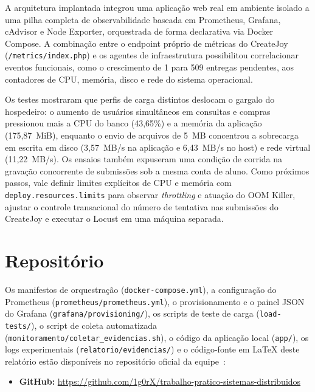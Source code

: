 \documentclass[conference]{IEEEtran}
\begin{document}
A arquitetura implantada integrou uma aplicação web real em ambiente isolado a uma pilha completa de observabilidade baseada em Prometheus, Grafana, cAdvisor e Node Exporter, orquestrada de forma declarativa via Docker Compose. A combinação entre o endpoint próprio de métricas do CreateJoy (\texttt{/metrics/index.php}) e os agentes de infraestrutura possibilitou correlacionar eventos funcionais, como o crescimento de 1 para 509 entregas pendentes, aos contadores de CPU, memória, disco e rede do sistema operacional.

Os testes mostraram que perfis de carga distintos deslocam o gargalo do hospedeiro: o aumento de usuários simultâneos em consultas e compras pressionou mais a CPU do banco (43,65\%) e a memória da aplicação (175,87~MiB), enquanto o envio de arquivos de 5~MB concentrou a sobrecarga em escrita em disco (3,57~MB/s na aplicação e 6,43~MB/s no host) e rede virtual (11,22~MB/s). Os ensaios também expuseram uma condição de corrida na gravação concorrente de submissões sob a mesma conta de aluno. Como próximos passos, vale definir limites explícitos de CPU e memória com \texttt{deploy.resources.limits} para observar \textit{throttling} e atuação do OOM Killer, ajustar o controle transacional do número de tentativa nas submissões do CreateJoy e executar o Locust em uma máquina separada.

\section{Repositório}

Os manifestos de orquestração (\texttt{docker-compose.yml}), a configuração do Prometheus (\texttt{prometheus/prometheus.yml}), o provisionamento e o painel JSON do Grafana (\texttt{grafana/provisioning/}), os scripts de teste de carga (\texttt{load-tests/}), o script de coleta automatizada (\texttt{monitoramento/coletar\_evidencias.sh}), o código da aplicação local (\texttt{app/}), os logs experimentais (\texttt{relatorio/evidencias/}) e o código-fonte em \LaTeX{} deste relatório estão disponíveis no repositório oficial da equipe~\cite{repositorio}:

\begin{itemize}
    \item \textbf{GitHub:} \url{https://github.com/1g0rX/trabalho-pratico-sistemas-distribuidos}
\end{itemize}
\end{document}
